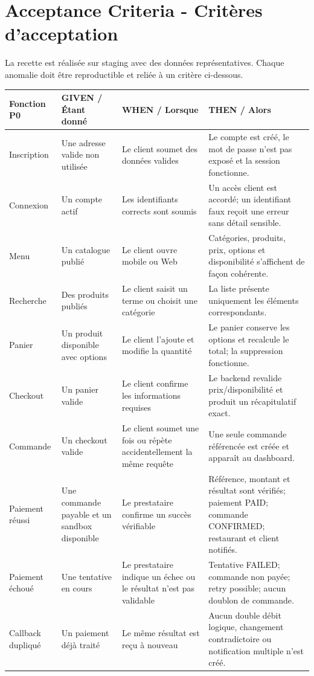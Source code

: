 \documentclass[10pt,a4paper]{article}
\begin{document}
\section{Acceptance Criteria - Critères d'acceptation}
La recette est réalisée sur staging avec des données représentatives. Chaque anomalie doit être reproductible et reliée à un critère ci-dessous.
\begin{longtable}{@{}L{2.7cm}L{4.1cm}L{4.2cm}L{4.3cm}@{}}
\toprule
\textbf{Fonction P0} & \textbf{GIVEN / Étant donné} & \textbf{WHEN / Lorsque} & \textbf{THEN / Alors} \\
\midrule
\endhead
Inscription & Une adresse valide non utilisée & Le client soumet des données valides & Le compte est créé, le mot de passe n'est pas exposé et la session fonctionne. \\
Connexion & Un compte actif & Les identifiants corrects sont soumis & Un accès client est accordé; un identifiant faux reçoit une erreur sans détail sensible. \\
Menu & Un catalogue publié & Le client ouvre mobile ou Web & Catégories, produits, prix, options et disponibilité s'affichent de façon cohérente. \\
Recherche & Des produits publiés & Le client saisit un terme ou choisit une catégorie & La liste présente uniquement les éléments correspondants. \\
Panier & Un produit disponible avec options & Le client l'ajoute et modifie la quantité & Le panier conserve les options et recalcule le total; la suppression fonctionne. \\
Checkout & Un panier valide & Le client confirme les informations requises & Le backend revalide prix/disponibilité et produit un récapitulatif exact. \\
Commande & Un checkout valide & Le client soumet une fois ou répète accidentellement la même requête & Une seule commande référencée est créée et apparaît au dashboard. \\
Paiement réussi & Une commande payable et un sandbox disponible & Le prestataire confirme un succès vérifiable & Référence, montant et résultat sont vérifiés; paiement PAID; commande CONFIRMED; restaurant et client notifiés. \\
Paiement échoué & Une tentative en cours & Le prestataire indique un échec ou le résultat n'est pas validable & Tentative FAILED; commande non payée; retry possible; aucun doublon de commande. \\
Callback dupliqué & Un paiement déjà traité & Le même résultat est reçu à nouveau & Aucun double débit logique, changement contradictoire ou notification multiple n'est créé. \\

\end{longtable}
\end{document}
